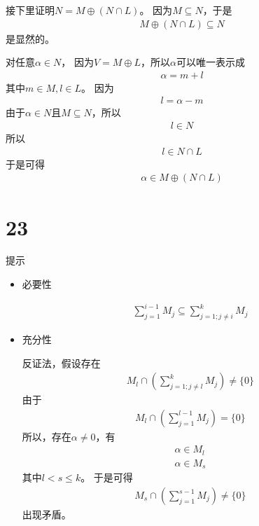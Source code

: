 \documentclass{article}
\begin{document}
接下里证明$N = M \oplus (N \cap L)$。
因为$M \subseteq N$，于是
\begin{align*}
  M \oplus (N \cap L) \subseteq N
\end{align*}
是显然的。

对任意$\alpha \in N$，
因为$V = M \oplus L$，所以$\alpha$可以唯一表示成
\begin{align*}
  \alpha = m + l
\end{align*}
其中$m \in M, l \in L$。
因为
\begin{align*}
  l = \alpha - m
\end{align*}
由于$\alpha \in N$且$M \subseteq N$，所以
\begin{align*}
  l \in N
\end{align*}
所以
\begin{align*}
  l \in N \cap L
\end{align*}
于是可得
\begin{align*}
  \alpha \in M \oplus (N \cap L)
\end{align*}

\section*{23}

提示
\begin{itemize}
  \item 必要性

        \begin{align*}
          \sum\limits_{j = 1}^{i - 1} M_j \subseteq \sum\limits_{j = 1; j \neq i}^{k} M_j
        \end{align*}

  \item 充分性

        反证法，假设存在
        \begin{align*}
          M_l \cap \left(\sum\limits_{j = 1; j \neq l}^{k} M_j\right) \neq \{0\}
        \end{align*}
        由于
        \begin{align*}
          M_l \cap \left(\sum\limits_{j = 1}^{l - 1} M_j\right) = \{0\}
        \end{align*}
        所以，存在$\alpha \neq 0$，有
        \begin{align*}
          \alpha \in M_l \\
          \alpha \in M_s
        \end{align*}
        其中$l < s \leq k$。
        于是可得
        \begin{align*}
          M_{s} \cap \left(\sum\limits_{j = 1}^{s-1} M_j\right) \neq \{0\}
        \end{align*}
        出现矛盾。
\end{itemize}
\end{document}
